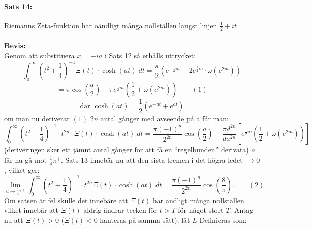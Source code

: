 \documentclass[a4paper,twoside]{article}%
\begin{document}
\paragraph{Sats 14:} Riemanns Zeta-funktion har oändligt många nollställen längst linjen $\frac 1 2 + it$ \\
\\
{\bf Bevis:} \\
Genom att substituera $x = -ia$ i Sats 12
så erhålls uttrycket:
\[
	\int_0^\infty (t^2 + \frac 1 4)^{-1} \Xi(t) \cdot \cosh(at) \; dt = \frac \pi 2 (e^{- \frac 1 2 ia} - 2 e^{\frac 1 2 ia}
		\cdot \omega(e^{2ia}))
\]
\[
	= \pi \cos(\frac a 2) - \pi e^{\frac 1 2 ia} (\frac 1 2 + \omega(e^{2 ia})) \qquad (1)
\]
\[
	\text{där } \cosh(at) = \frac 1 2 (e^{-at} + e^{at})
\]
om man nu deriverar $(1)$ $2n$ antal gånger med avseende på a får man:
\[
	\int_0^\infty (t^2 + \frac 1 4)^{-1} \cdot t^{2n} \cdot \Xi(t) \cdot \cosh(at) \; dt = \frac {\pi(-1)^n}{2^{2n}}
		\cos(\frac a 2) - \frac {\pi d^{2n}} {da^{2n}} \left [
			e^{\frac 1 2 ia} (\frac 1 2 + \omega(e^{2ia}))
		\right ]
\]
(deriveringen sker ett jämnt antal gånger för att få en ``regelbunden'' derivata)
$a$ får nu gå mot $\frac 1 4 \pi^+$.
Sats 13 innebär nu att den sista tremen i det högra ledet $\to 0$, vilket ger:
\[
	\lim_{a \to \frac 1 4 \pi^+} \int_0^\infty (t^2 + \frac 1 4)^{-1} \cdot t^{2n}\Xi(t) \cdot \cosh(at) \; dt = 
		\frac {\pi (-1)^n} {2^{2n}} \cos(\frac 8 \pi). \qquad (2)
\]
Om satsen är fel skulle det innebäre att $\Xi(t)$ har ändligt många nollställen vilket innebär att $\Xi(t)$ aldrig ändrar
tecken för $t > T$ för något stort $T$. Antag nu att $\Xi(t) > 0$ ($\Xi(t) < 0$ hanteras på samma sätt). låt $L$ Definieras som:
\newcommand{\skit} {
	\Xi(t)
}
\end{document}
